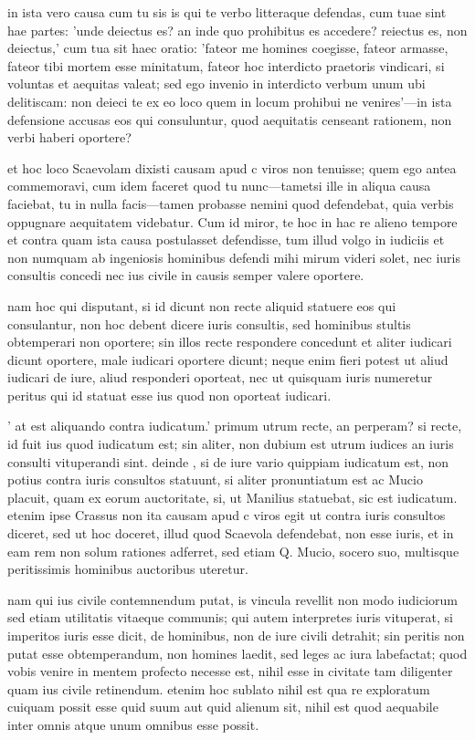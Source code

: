  in ista vero causa cum tu sis is qui te verbo litteraque defendas, cum tuae sint hae partes: 'unde deiectus es? an inde quo prohibitus es accedere? reiectus es, non deiectus,' cum tua sit haec oratio: 'fateor me homines coegisse, fateor armasse, fateor tibi mortem esse minitatum, fateor hoc interdicto praetoris vindicari, si voluntas et aequitas valeat; sed ego invenio in interdicto verbum unum ubi delitiscam: non deieci te ex eo loco quem in locum prohibui ne venires'—in ista defensione accusas eos qui consuluntur, quod aequitatis censeant rationem, non verbi haberi oportere?

 et hoc loco Scaevolam dixisti causam apud c viros non tenuisse; quem ego antea commemoravi, cum idem faceret quod tu nunc—tametsi ille in aliqua causa faciebat, tu in nulla facis—tamen probasse nemini quod defendebat, quia verbis oppugnare aequitatem videbatur. Cum id miror, te hoc in hac re alieno tempore et contra quam ista causa postulasset defendisse, tum illud volgo in iudiciis et non numquam ab ingeniosis hominibus defendi mihi mirum videri solet, nec iuris consultis concedi nec ius civile in causis semper valere oportere.

 nam hoc qui disputant, si id dicunt non recte aliquid statuere eos qui consulantur, non hoc debent dicere iuris consultis, sed hominibus stultis obtemperari non oportere; sin illos recte respondere concedunt et aliter iudicari dicunt oportere, male iudicari oportere dicunt; neque enim fieri potest ut aliud iudicari de iure, aliud responderi oporteat, nec ut quisquam iuris numeretur peritus qui id statuat esse ius quod non oporteat iudicari.

 ' at est aliquando contra iudicatum.' primum utrum recte, an perperam? si recte, id fuit ius quod iudicatum est; sin aliter, non dubium est utrum iudices an iuris consulti vituperandi sint. deinde , si de iure vario quippiam iudicatum est, non potius contra iuris consultos statuunt, si aliter pronuntiatum est ac Mucio placuit, quam ex eorum auctoritate, si, ut Manilius statuebat, sic est iudicatum. etenim ipse Crassus non ita causam apud c viros egit ut contra iuris consultos diceret, sed ut hoc doceret, illud quod Scaevola defendebat, non esse iuris, et in eam rem non solum rationes adferret, sed etiam Q. Mucio, socero suo, multisque peritissimis hominibus auctoribus uteretur.

 nam qui ius civile contemnendum putat, is vincula revellit non modo iudiciorum sed etiam utilitatis vitaeque communis; qui autem interpretes iuris vituperat, si imperitos iuris esse dicit, de hominibus, non de iure civili detrahit; sin peritis non putat esse obtemperandum, non homines laedit, sed leges ac iura labefactat; quod vobis venire in mentem profecto necesse est, nihil esse in civitate tam diligenter quam ius civile retinendum. etenim hoc sublato nihil est qua re exploratum cuiquam possit esse quid suum aut quid alienum sit, nihil est quod aequabile inter omnis atque unum omnibus esse possit.

